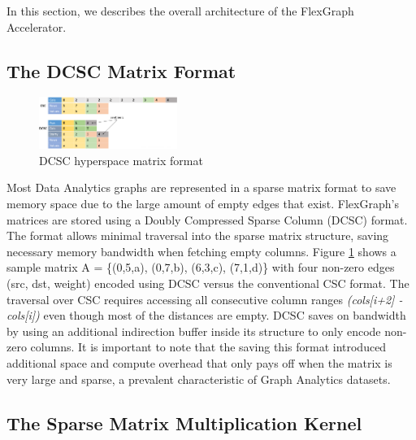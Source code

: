 In this section, we describes the overall architecture of the FlexGraph Accelerator.

\subsection{The DCSC Matrix Format}

\begin{figure}[htbp]
\centering
\includegraphics[width=0.4\textwidth]{figures/DCSC_matrix_format}
\caption{DCSC hyperspace matrix format}
\label{fig:DCSC_matrix_format}
\end{figure}

Most Data Analytics graphs are represented in a sparse matrix format to save memory space due to the large amount of empty edges that exist. FlexGraph's matrices are stored using a Doubly Compressed Sparse Column (DCSC) \cite{DCSC} format. The format allows minimal traversal into the sparse matrix structure, saving necessary memory bandwidth when fetching empty columns. Figure \ref{fig:DCSC_matrix_format} shows a sample matrix A = \{(0,5,a), (0,7,b), (6,3,c), (7,1,d)\} with four non-zero edges (src, dst, weight) encoded using DCSC versus the conventional CSC \cite{CSC} format. The traversal over CSC requires accessing all consecutive column ranges \textit{(cols[i+2] - cols[i])} even though most of the distances are empty. DCSC saves on bandwidth by using an additional indirection  buffer inside its structure to only encode non-zero columns. It is important to note that the saving this format introduced additional space and compute overhead that only pays off when the matrix is very large and sparse, a prevalent characteristic of Graph Analytics datasets.

\subsection{The Sparse Matrix Multiplication Kernel}

